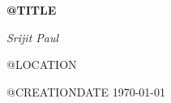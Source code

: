 \thispagestyle{empty}

\begin{center}
	\vfill
    \vspace*{0.4\textheight}

	\Huge
	\bf{@TITLE}
    
	\Large
	\it{Srijit Paul}

        \vspace*{0.4\textheight}
        \large
        {@LOCATION}
        
        \large
        {@CREATIONDATE}
        \monthdayyeardate\today
	
    \normalsize
    
\end{center}